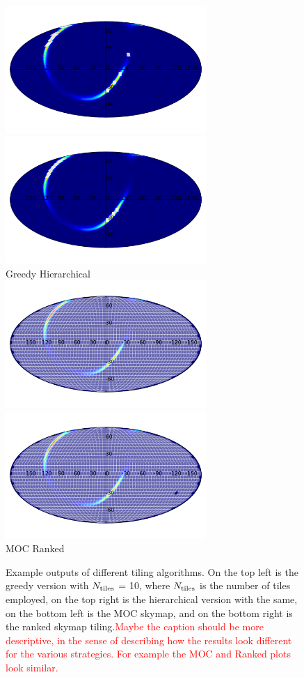 \documentclass[twocolumn]{aastex62}
\begin{document}
\begin{figure}
    \centering
    \includegraphics[width=3in]{tiling_greedy}
    \includegraphics[width=3in]{tiling_hierarchical} \\
    Greedy \hspace{2.6in}Hierarchical\\
    \includegraphics[width=3in]{tiling_moc}
    \includegraphics[width=3in]{tiling_ranked} \\
    MOC \hspace{2.6in}Ranked
	\caption{Example outputs of different tiling algorithms. On the top left is the greedy version with $N_{\rm tiles}$ = 10, where $N_{\rm tiles}$ is the number of tiles employed, on the top right is the hierarchical version with the same, on the bottom left is the MOC skymap, and on the bottom right is the ranked skymap tiling.\textcolor{red}{Maybe the caption should be
	more descriptive, in the sense of describing how the results look different for the various strategies. For example the MOC and Ranked plots look similar.}
	}
    \label{fig:tiling}
\end{figure}
\end{document}
